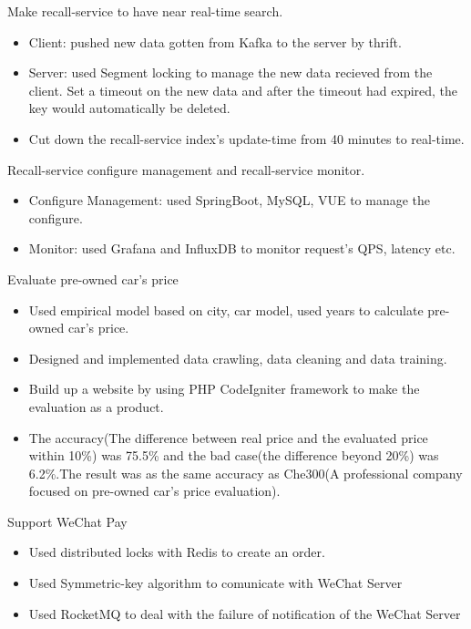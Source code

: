\documentclass{resume}
\begin{document}
Make recall-service to have near real-time search.
\begin{itemize}
  \item Client: pushed new data gotten from Kafka to the server by thrift.
  \item Server: used Segment locking to manage the new data recieved from the client. Set a timeout on the new data and after the timeout had expired, the key would automatically be deleted.
  \item Cut down the recall-service index's update-time from 40 minutes to real-time.
\end{itemize}

Recall-service configure management and recall-service monitor.
\begin{itemize}
  \item Configure Management: used SpringBoot, MySQL, VUE to manage the configure.
  \item Monitor: used Grafana and InfluxDB to monitor request's QPS, latency etc.
\end{itemize}

Evaluate pre-owned car's price
\begin{itemize}
  \item Used empirical model based on city, car model, used years to calculate pre-owned car's price.
  \item Designed and implemented data crawling, data cleaning and data training.
  \item Build up a website by using PHP CodeIgniter framework to make the evaluation as a product.
  \item The accuracy(The difference between real price and the evaluated price within 10\%) was 75.5\% and the bad case(the difference beyond 20\%) was 6.2\%.The result was as the same accuracy as Che300(A professional company focused on pre-owned car's price evaluation).
\end{itemize}

Support WeChat Pay
\begin{itemize}
  \item Used distributed locks with Redis to create an order.
  \item Used Symmetric-key algorithm to comunicate with WeChat Server
  \item Used RocketMQ to deal with the failure of notification of the WeChat Server
\end{itemize}
\end{document}
